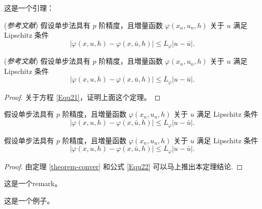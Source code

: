 \documentclass{shnuthesis}
\begin{document}
这是一个引理：
\begin{lemma}\label{lemma-conver} {\rm (\textit{参考文献}\cite{Shen1994})}
假设单步法具有 $p$ 阶精度，且増量函数 $\varphi(x_{n}, u_{n}, h)$ 关于 $u$ 满足 Lipschitz 条件
\begin{equation}\label{Equ22}
|\varphi(x, u, h)-\varphi(x, \bar{u}, h)| \leqslant L_{\varphi}|u-\bar{u}|.
\end{equation}
\end{lemma}

\begin{theorem}\label{theorem-conver} {\rm (\textit{参考文献}\cite{Adams1975})}
假设单步法具有 $p$ 阶精度，且増量函数 $\varphi(x_{n}, u_{n}, h)$ 关于 $u$ 满足 Lipschitz 条件
\begin{equation}\label{Equ23}
|\varphi(x, u, h)-\varphi(x, \bar{u}, h)| \leqslant L_{\varphi}|u-\bar{u}|.
\end{equation}
\end{theorem}
\begin{proof}
关于方程 \eqref{Equ21}，证明上面这个定理。
\end{proof}


\begin{theorem}\label{theorem-conver2}
假设单步法具有 $p$ 阶精度，且増量函数 $\varphi(x_{n}, u_{n}, h)$ 关于 $u$ 满足 Lipschitz 条件
\begin{equation}\label{Equ24}
|\varphi(x, u, h)-\varphi(x, \bar{u}, h)| \leqslant L_{\varphi}|u-\bar{u}|.
\end{equation}
\end{theorem}

\begin{corollary}\label{col-conver}
假设单步法具有 $p$ 阶精度，且増量函数 $\varphi(x_{n}, u_{n}, h)$ 关于 $u$ 满足 Lipschitz 条件
\begin{equation}\label{Equ25}
|\varphi(x, u, h)-\varphi(x, \bar{u}, h)| \leqslant L_{\varphi}|u-\bar{u}|.
\end{equation}
\end{corollary}
\begin{proof}
 由定理 \ref{theorem-conver} 和公式 \ref{Equ22} 可以马上推出本定理结论.
\end{proof}


\begin{remark}\label{rem2}
这是一个remark。
\end{remark}



\begin{example}
这是一个例子。
\end{example}
\end{document}

